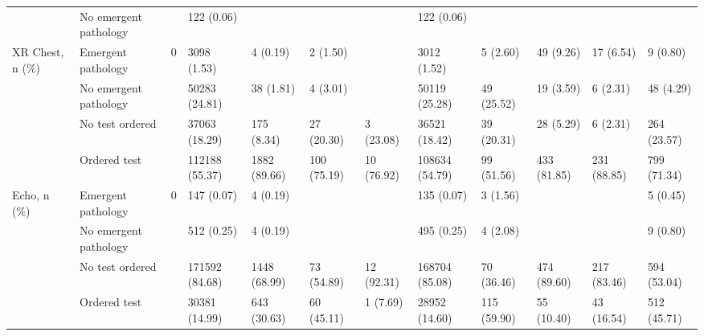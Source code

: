 \begin{tabular}{llllllllllll}
 & No emergent pathology &  & 122 (0.06) &  &  &  & 122 (0.06) &  &  &  &  \\
\cline{1-12}
\multirow[t]{4}{*}{XR Chest, n (\%)} & Emergent pathology & 0 & 3098 (1.53) & 4 (0.19) & 2 (1.50) &  & 3012 (1.52) & 5 (2.60) & 49 (9.26) & 17 (6.54) & 9 (0.80) \\
 & No emergent pathology &  & 50283 (24.81) & 38 (1.81) & 4 (3.01) &  & 50119 (25.28) & 49 (25.52) & 19 (3.59) & 6 (2.31) & 48 (4.29) \\
 & No test ordered &  & 37063 (18.29) & 175 (8.34) & 27 (20.30) & 3 (23.08) & 36521 (18.42) & 39 (20.31) & 28 (5.29) & 6 (2.31) & 264 (23.57) \\
 & Ordered test &  & 112188 (55.37) & 1882 (89.66) & 100 (75.19) & 10 (76.92) & 108634 (54.79) & 99 (51.56) & 433 (81.85) & 231 (88.85) & 799 (71.34) \\
\cline{1-12}
\multirow[t]{4}{*}{Echo, n (\%)} & Emergent pathology & 0 & 147 (0.07) & 4 (0.19) &  &  & 135 (0.07) & 3 (1.56) &  &  & 5 (0.45) \\
 & No emergent pathology &  & 512 (0.25) & 4 (0.19) &  &  & 495 (0.25) & 4 (2.08) &  &  & 9 (0.80) \\
 & No test ordered &  & 171592 (84.68) & 1448 (68.99) & 73 (54.89) & 12 (92.31) & 168704 (85.08) & 70 (36.46) & 474 (89.60) & 217 (83.46) & 594 (53.04) \\
 & Ordered test &  & 30381 (14.99) & 643 (30.63) & 60 (45.11) & 1 (7.69) & 28952 (14.60) & 115 (59.90) & 55 (10.40) & 43 (16.54) & 512 (45.71) \\
\cline{1-12}
\bottomrule
\end{tabular}
